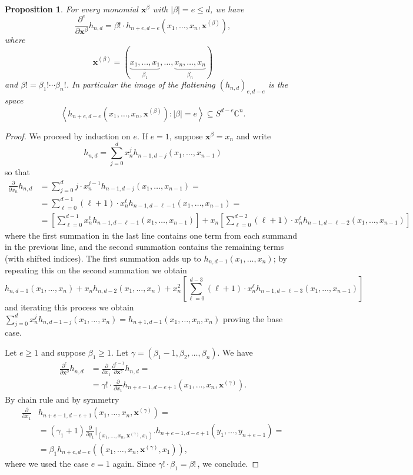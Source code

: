 \documentclass[11pt]{article}
\numberwithin{equation}{section}
\newtheorem{proposition}[theorem]{Proposition}
\theoremstyle{definition}
\theoremstyle{plain}
\newcommand{\vvirg}{ , \dots , }
\newcommand{\bfx}{\mathbf{x}}
\newcommand{\bbC}{\mathbb{C}}
\begin{document}
\begin{proposition}\label{prop: derivatives of h}
 For every monomial $\bfx^\beta$ with $\vert \beta \vert = e \leq d$, we have 
 \[
  \frac{\partial^e}{\partial \bfx^\beta} h_{n,d} = \beta! \cdot h_{n+e , d-e} (x_1 \vvirg x_n, \bfx^{(\beta)}),
 \]
 where
 \[
   \bfx^{(\beta)} = (\underbrace{x_1 \vvirg x_1}_{\beta_1} \vvirg \underbrace{x_n \vvirg x_n}_{\beta_n})
 \]
 and $\beta! = \beta_1! \cdots \beta_n!$. In particular the image of
 the flattening $(h_{n,d})_{e,d-e}$ is the space
\[
\left\langle  h_{n+e,d-e}(x_1 \vvirg x_n,\bfx^{(\beta)}) : \vert \beta \vert = e \right\rangle \subseteq S^{d-e} \bbC^n.
\]
\end{proposition}
\begin{proof}
  We proceed by induction on $e$. If $e = 1$, suppose $\bfx^\beta = x_n$ and write
  \[
    h_{n,d} = \sum_{j=0}^d x_n^j h_{n-1, d-j}(x_1 \vvirg x_{n-1})
  \]
  so that
 \begin{align*}
  \frac{\partial}{\partial x_n} h_{n,d} &= \sum_{j=0}^d j \cdot x_n^{j-1} h_{n-1, d-j}(x_1 \vvirg x_{n-1}) = \\
  &= \sum_{\ell=0}^{d-1} (\ell+1) \cdot x_n^\ell h_{n-1, d-\ell -1}(x_1 \vvirg x_{n-1}) = \\
  & = \left[\sum_{\ell=0}^{d-1} x_n^\ell h_{n-1, d-\ell -1}(x_1 \vvirg x_{n-1})\right] + x_n\left[\sum_{\ell=0}^{d-2} (\ell+1) \cdot x_n^\ell h_{n-1, d-\ell -2}(x_1 \vvirg x_{n-1})\right]
 \end{align*}
where the first summation in the last line contains one term from each summand in the previous line, and the second summation contains the remaining terms (with shifted indices). The first summation adds up to $h_{n,d-1} (x_1 \vvirg x_n)$; by repeating this on the second summation we obtain
\[
h_{n,d-1} (x_1 \vvirg x_n) + x_n h_{n,d-2} (x_1 \vvirg x_n) + x_n^2 \left[\sum_{\ell=0}^{d-3} (\ell+1) \cdot x_n^\ell h_{n-1, d-\ell -3}(x_1 \vvirg x_{n-1})\right]
\]
and iterating this process we obtain $\sum_{j = 0}^d x_n^j h_{n,d-1 -j} (x_1 \vvirg x_n) = h_{n+1,d-1}(x_1 \vvirg x_n,x_n)$ proving the base case.

Let $e \geq 1$ and suppose $\beta_1 \geq 1$. Let $\gamma = (\beta_1-1,\beta_2 \vvirg \beta_n)$. We have
 \begin{align*}
  \frac{\partial^e}{\partial \bfx^\beta} h_{n,d} &= \frac{\partial }{\partial x_1} \frac{\partial ^{e-1}}{\partial \bfx^\gamma} h_{n,d} = \\
  &= \gamma! \cdot \frac{\partial}{\partial x_1} h_{n+e-1,d-e+1}(x_1 \vvirg x_n, \bfx^{(\gamma)}).
  \end{align*}
 By chain rule and by symmetry
  \begin{align*}
\frac{\partial}{\partial x_1} &h_{n+e-1,d-e+1}(x_1 \vvirg x_n, \bfx^{(\gamma)}) = \\
&=(\gamma_1+1) \frac{\partial}{\partial y_1}\bigl\vert_{(x_1 \vvirg x_n, \bfx^{(\gamma)},x_1)} \bigr. h_{n+e-1,d-e+1}(y_1 \vvirg y_{n+e-1})= \\ 
&=\beta_1 h_{n+e,d-e}((x_1 \vvirg x_n, \bfx^{(\gamma)},x_1)),
  \end{align*}
  where we used the case $e = 1$ again. Since $\gamma! \cdot \beta_1 = \beta!$\,, we conclude.
\end{proof}
\end{document}
